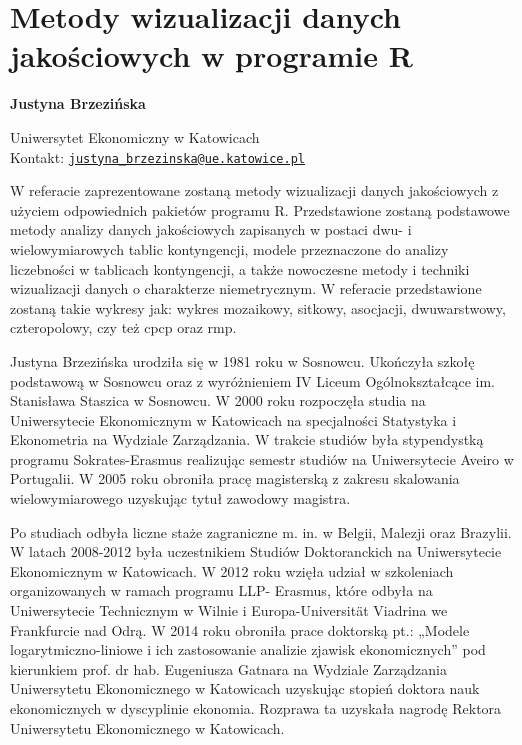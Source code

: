 \documentclass[\main/boa.tex]{subfiles}
\begin{document}
\section{Metody wizualizacji danych jakościowych w programie R}


\begin{minipage}{0.915\textwidth}
	\centering
  {\bf \LARGE {} Justyna Brzezińska}
\end{minipage}


\begin{affiliations}
\begin{minipage}{0.915\textwidth}
\centering
\large Uniwersytet Ekonomiczny w Katowicach   \\[1pt]
Kontakt: \href{mailto:justyna_brzezinska@ue.katowice.pl}{\nolinkurl{justyna_brzezinska@ue.katowice.pl}}\\
\end{minipage}
\end{affiliations}

W referacie zaprezentowane zostaną metody wizualizacji danych jakościowych z użyciem odpowiednich pakietów programu R. Przedstawione zostaną podstawowe metody analizy danych jakościowych zapisanych w postaci dwu- i wielowymiarowych tablic kontyngencji, modele przeznaczone do analizy liczebności w tablicach kontyngencji, a także nowoczesne metody i techniki wizualizacji danych o charakterze niemetrycznym. W referacie przedstawione zostaną takie wykresy jak: wykres mozaikowy, sitkowy, asocjacji, dwuwarstwowy, czteropolowy, czy też cpcp oraz rmp. 

\bio
Justyna Brzezińska urodziła się w 1981 roku w Sosnowcu. Ukończyła szkołę podstawową w Sosnowcu oraz z wyróżnieniem IV Liceum Ogólnokształcące im. Stanisława Staszica w Sosnowcu. W 2000 roku rozpoczęła studia na Uniwersytecie Ekonomicznym w Katowicach na specjalności Statystyka i Ekonometria na Wydziale Zarządzania. W trakcie studiów była stypendystką programu Sokrates-Erasmus realizując semestr studiów na Uniwersytecie Aveiro w Portugalii. W 2005 roku obroniła pracę magisterską z zakresu skalowania wielowymiarowego uzyskując tytuł zawodowy magistra.

Po studiach odbyła liczne staże zagraniczne m. in. w Belgii, Malezji oraz Brazylii. W latach 2008-2012 była uczestnikiem Studiów Doktoranckich na Uniwersytecie Ekonomicznym w Katowicach. W 2012 roku wzięła udział w szkoleniach organizowanych w ramach programu LLP- Erasmus, które odbyła na Uniwersytecie Technicznym w Wilnie i Europa-Universität Viadrina we Frankfurcie nad Odrą. W 2014 roku obroniła prace doktorską pt.: „Modele logarytmiczno-liniowe i ich zastosowanie analizie zjawisk ekonomicznych” pod kierunkiem prof. dr hab. Eugeniusza Gatnara na Wydziale Zarządzania Uniwersytetu Ekonomicznego w Katowicach uzyskując stopień doktora nauk ekonomicznych w dyscyplinie ekonomia. Rozprawa ta uzyskała nagrodę Rektora Uniwersytetu Ekonomicznego w Katowicach.
\end{document}
